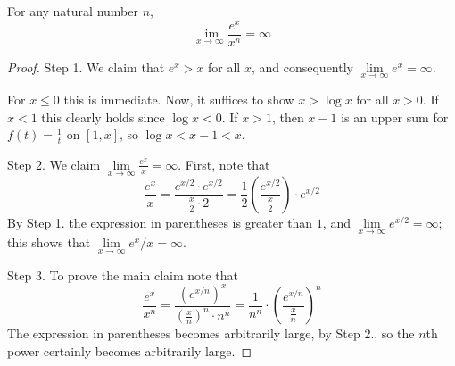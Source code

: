 \begin{theorem}
    For any natural number $n$, \begin{equation}
        \lim\limits_{x\rightarrow \infty}\frac{e^x}{x^n} = \infty
    \end{equation}
\end{theorem}
\begin{proof}
    Step 1. We claim that $e^x > x$ for all $x$, and consequently $\lim\limits_{x\rightarrow \infty}e^x = \infty$.

    For $x \leq 0$ this is immediate. Now, it suffices to show $x > \log x$ for all $x > 0$. If $x < 1$ this clearly holds since $\log x < 0$. If $x > 1$, then $x-1$ is an upper sum for $f(t) = \frac{1}{t}$ on $[1,x]$, so $\log x < x-1 < x$.


    Step 2. We claim $\lim\limits_{x\rightarrow \infty}\frac{e^x}{x} = \infty$. First, note that \begin{equation*}
        \frac{e^x}{x} = \frac{e^{x/2}\cdot e^{x/2}}{\frac{x}{2}\cdot 2} = \frac{1}{2}\left(\frac{e^{x/2}}{\frac{x}{2}}\right)\cdot e^{x/2}
    \end{equation*}
    By Step 1. the expression in parentheses is greater than $1$, and $\lim\limits_{x\rightarrow \infty}e^{x/2} = \infty$; this shows that $\lim\limits_{x\rightarrow \infty}e^x/x = \infty$.


    Step 3. To prove the main claim note that \begin{equation*}
        \frac{e^x}{x^n} = \frac{(e^{x/n})^x}{\left(\frac{x}{n}\right)^n\cdot n^n} = \frac{1}{n^n}\cdot \left(\frac{e^{x/n}}{\frac{x}{n}}\right)^n
    \end{equation*}
    The expression in parentheses becomes arbitrarily large, by Step 2., so the $n$th power certainly becomes arbitrarily large.
\end{proof}


